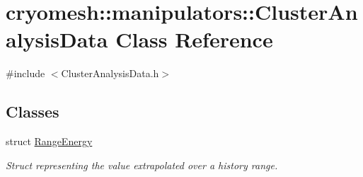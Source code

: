 \hypertarget{classcryomesh_1_1manipulators_1_1ClusterAnalysisData}{\section{cryomesh\-:\-:manipulators\-:\-:\-Cluster\-Analysis\-Data \-Class \-Reference}
\label{classcryomesh_1_1manipulators_1_1ClusterAnalysisData}
}


{\ttfamily \#include $<$\-Cluster\-Analysis\-Data.\-h$>$}

\subsection*{\-Classes}
\begin{DoxyCompactItemize}
\item 
struct \hyperlink{structcryomesh_1_1manipulators_1_1ClusterAnalysisData_1_1RangeEnergy}{\-Range\-Energy}
\begin{DoxyCompactList}\small\item\em \-Struct representing the value extrapolated over a history range. \end{DoxyCompactList}\end{DoxyCompactItemize}
